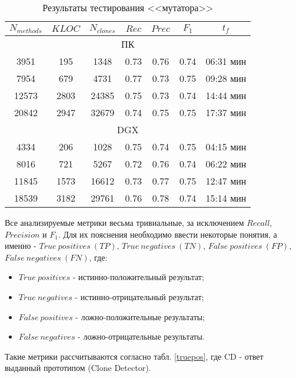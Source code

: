 \begin{table}[H]
\centering
\captionsetup{skip=5pt}
\caption{Результаты тестирования <<мутатора>>}
\label{mutator}
\begin{tabular}{|c|c|c|c|c|c|c|}
\hline
\(N_{methods}\) & \(KLOC\) & \(N_{clones}\) & \(Rec\)  & \(Prec\) & \(F_1\) & \(t_f\)        \\ \hline
\multicolumn{7}{|c|}{ПК}                                       \\ \hline
3951       & 195  & 1348      & 0.73 & 0.76 & 0.74 & 06:31 мин \\ \hline
7954       & 679  & 4731      & 0.77 & 0.73 & 0.75 & 09:28 мин \\ \hline
12573      & 2803 & 24385     & 0.75 & 0.73 & 0.74 & 14:44 мин \\ \hline
20842      & 2947 & 32679     & 0.74 & 0.75 & 0.75 & 17:37 мин \\ \hline
\multicolumn{7}{|c|}{DGX}                                      \\ \hline
4334       & 206  & 1028      & 0.75 & 0.74 & 0.75 & 04:15 мин \\ \hline
8016       & 721  & 5267      & 0.72 & 0.76 & 0.74 & 06:22 мин \\ \hline
11845      & 1573 & 16612     & 0.73 & 0.77 & 0.75 & 12:47 мин \\ \hline
18539      & 3182 & 29761     & 0.76 & 0.78 & 0.74 & 15:14 мин \\ \hline
\end{tabular}
\end{table}

Все анализируемые метрики весьма тривиальные, за исключением \(Recall\), \(Precision\) и \(F_1\). Для их пояснения необходимо ввести некоторые понятия, а именно - \(True\ positives\ (TP)\), \(True\ negatives\ (TN)\), \(False\ positives\ (FP)\), \(False\ negatives\ (FN)\), где:

\begin{itemize}
\setlength\itemsep{0mm}
\item \(True\ positives\) - истинно-положительный результат;
\item \(True\ negatives\) -  истинно-отрицательный результат;
\item \(False\ positives\) - ложно-положительные результаты;
\item \(False\ negatives\) - ложно-отрицательные результаты.
\end{itemize}

Такие метрики рассчитываются согласно табл. \ref{truepos}, где CD - ответ выданный прототипом (Clone Detector).

